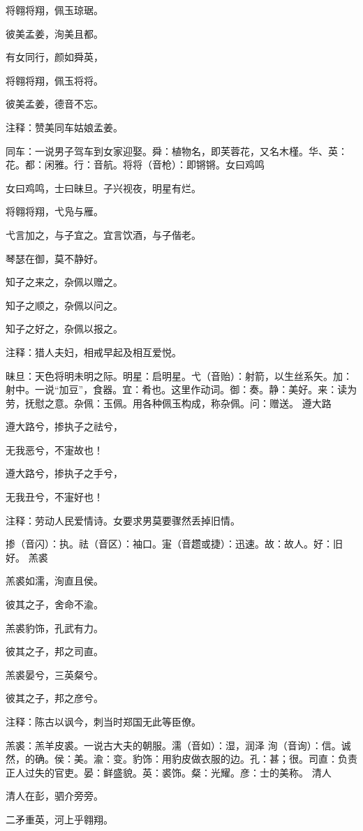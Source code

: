 \documentclass[12pt,UTF8]{ctexbook}
\begin{document}
将翱将翔，佩玉琼琚。

彼美孟姜，洵美且都。

有女同行，颜如舜英，

将翱将翔，佩玉将将。

彼美孟姜，德音不忘。

注释：赞美同车姑娘孟姜。

同车：一说男子驾车到女家迎娶。舜：植物名，即芙蓉花，又名木槿。华、英：花。都：闲雅。行：音航。将将（音枪）：即锵锵。女曰鸡鸣

女曰鸡鸣，士曰昧旦。子兴视夜，明星有烂。

将翱将翔，弋凫与雁。

弋言加之，与子宜之。宜言饮酒，与子偕老。

琴瑟在御，莫不静好。

知子之来之，杂佩以赠之。

知子之顺之，杂佩以问之。

知子之好之，杂佩以报之。

注释：猎人夫妇，相戒早起及相互爱悦。

昧旦：天色将明未明之际。明星：启明星。弋（音贻）：射箭，以生丝系矢。加：射中。一说“加豆”，食器。宜：肴也。这里作动词。御：奏。静：美好。来：读为劳，抚慰之意。杂佩：玉佩。用各种佩玉构成，称杂佩。问：赠送。 遵大路

遵大路兮，掺执子之祛兮，

无我恶兮，不寁故也！

遵大路兮，掺执子之手兮，

无我丑兮，不寁好也！

注释：劳动人民爱情诗。女要求男莫要骤然丢掉旧情。

掺（音闪）：执。祛（音区）：袖口。寁（音趱或捷）：迅速。故：故人。好：旧好。 羔裘

羔裘如濡，洵直且侯。

彼其之子，舍命不渝。

羔裘豹饰，孔武有力。

彼其之子，邦之司直。

羔裘晏兮，三英粲兮。

彼其之子，邦之彦兮。

注释：陈古以讽今，刺当时郑国无此等臣僚。

羔裘：羔羊皮裘。一说古大夫的朝服。濡（音如）：湿，润泽 洵（音询）：信。诚然，的确。侯：美。渝：变。豹饰：用豹皮做衣服的边。孔：甚；很。司直：负责正人过失的官吏。晏：鲜盛貌。英：裘饰。粲：光耀。彦：士的美称。 清人

清人在彭，驷介旁旁。

二矛重英，河上乎翱翔。
\end{document}
